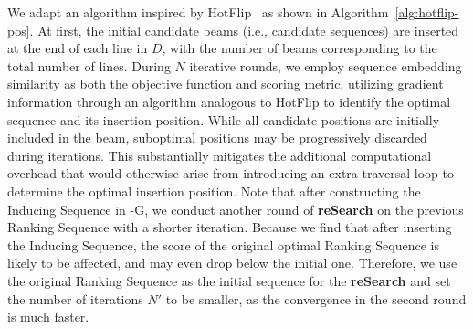 We adapt an algorithm inspired by HotFlip~\citep{ebrahimi2017hotflip} as shown in Algorithm~\ref{alg:hotflip-pos}. 
At first, the initial candidate beams (i.e., candidate sequences) are inserted at the end of each line in $D$, with the number of beams corresponding to the total number of lines. During $N$ iterative rounds, we employ sequence embedding similarity as both the objective function and scoring metric, utilizing gradient information through an algorithm analogous to HotFlip to identify the optimal sequence and its insertion position. While all candidate positions are initially included in the beam, suboptimal positions may be progressively discarded during iterations. This substantially mitigates the additional computational overhead that would otherwise arise from introducing an extra traversal loop to determine the optimal insertion position.
Note that after constructing the Inducing Sequence in \method-G, we conduct another round of \textbf{reSearch} on the previous Ranking Sequence with a shorter iteration. Because we find that after inserting the Inducing Sequence, the score of the original optimal Ranking Sequence is likely to be affected, and may even drop below the initial one. Therefore, we use the original Ranking Sequence as the initial sequence for the \textbf{reSearch} and set the number of iterations $N'$ to be smaller, as the convergence in the second round is much faster.

